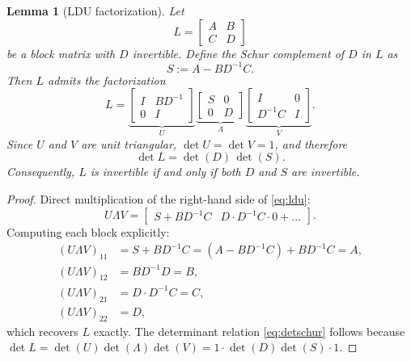\documentclass[11pt]{article}
\newtheorem{lemma}{Lemma}[section]
\begin{document}
\begin{lemma}[LDU factorization]
\label{lem:ldu}
Let
\[
    L =
    \begin{bmatrix}
        A & B \\ C & D
    \end{bmatrix}
\]
be a block matrix with $D$ invertible.  Define the Schur complement of $D$ in
$L$ as
\begin{equation}
    S := A - BD^{-1}C.
    \label{eq:schur_def}
\end{equation}
Then $L$ admits the factorization
\begin{equation}
    L
    =
    \underbrace{
    \begin{bmatrix}
        I & BD^{-1} \\ 0 & I
    \end{bmatrix}
    }_{U}
    \underbrace{
    \begin{bmatrix}
        S & 0 \\ 0 & D
    \end{bmatrix}
    }_{\Lambda}
    \underbrace{
    \begin{bmatrix}
        I & 0 \\ D^{-1}C & I
    \end{bmatrix}
    }_{V}.
    \label{eq:ldu}
\end{equation}
Since $U$ and $V$ are unit triangular, $\det U = \det V = 1$, and therefore
\begin{equation}
    \det L = \det(D)\,\det(S).
    \label{eq:detschur}
\end{equation}
Consequently, $L$ is invertible if and only if both $D$ and $S$ are invertible.
\end{lemma}

\begin{proof}
Direct multiplication of the right-hand side of \eqref{eq:ldu}:
\[
    U\Lambda V
    =
    \begin{bmatrix}
        S + BD^{-1}C & D \cdot D^{-1}C \cdot 0 + \ldots
    \end{bmatrix}.
\]
Computing each block explicitly:
\begin{align*}
    (U\Lambda V)_{11}
        &= S + BD^{-1}C = (A - BD^{-1}C) + BD^{-1}C = A,\\
    (U\Lambda V)_{12}
        &= BD^{-1}D = B,\\
    (U\Lambda V)_{21}
        &= D\cdot D^{-1}C = C,\\
    (U\Lambda V)_{22}
        &= D,
\end{align*}
which recovers $L$ exactly.
The determinant relation \eqref{eq:detschur} follows because
$\det L = \det(U)\det(\Lambda)\det(V) = 1\cdot\det(D)\det(S)\cdot 1$.
\end{proof}
\end{document}
